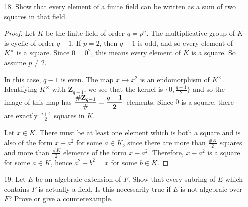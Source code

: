 \documentclass[10pt]{article}
\newcommand{\Z}{\mathbf{Z}}
\let\ker\relax
\DeclareMathOperator*{\ker}{Ker}
\DeclareMathOperator*{\Char}{char}
\begin{document}
\begin{enumerate}
\begin{proof}
Now, suppose $\Char(K) = p$ and every element of $K$ has a $p$-th root in $K$.  Assume, for a contradiction, that some element $\alpha$ is not separable over $K$, and let $f(X)$ be its minimal polynomial.  Then $f(X) = a_nX^n + \cdots + a_1X + a_0$.  Each $a_i$ has a $p$th root $b_i$, and so
$$
f(X) = a_nX^n + \cdots + a_1X + a_0 = (b_nX^n + \cdots + b_1X + b_0)^p
$$
contradicting that $f(X)$ was irreducible.

For the converse, suppose that every algebraic extension of $K$ is separable but that $\Char(K) \neq 0$, so that $\Char(K) = p$.  Let $a \in K$ and consider the polynomial $f(X) = X^p - a$.  If $\alpha$ is a root of this in some algebraic closure, then the minimal polynomial of $\alpha$ over $K$ divides $f(X) = (X - \alpha)^p$, hence is of the form $(X - \alpha)^q$ for some $q \leq p$.  If $q > 1$ then $\alpha$ is not separable, a contradiction.  So $X - \alpha \in K[X]$, meaning $\alpha \in K$.  So every element of $K$ has a $p$th root in $K$.
\end{proof}

\item[18.] Show that every element of a finite field can be written as a sum of two squares in that field.

\begin{proof}
Let $K$ be the finite field of order $q = p^n$.  The multiplicative group of $K$ is cyclic of order $q-1$.  If $p = 2$, then $q-1$ is odd, and so every element of $K^\times$ is a square.  Since $0 = 0^2$, this means every element of $K$ is a square.  So assume $p \neq 2$.

In this case, $q-1$ is even.  The map $x \mapsto x^2$ is an endomorphism of $K^\times$.  Identifying $K^\times$ with $\Z_{q-1}$, we see that the kernel is $\{0, \frac{q-1}{2}\}$ and so the image of this map has $\dfrac{\# \Z_{q-1}}{\# \ker} = \dfrac{q-1}{2}$ elements.  Since $0$ is a square, there are exactly $\frac{q+1}{2}$ squares in $K$.

Let $x \in K$.  There must be at least one element which is both a square and is also of the form $x - a^2$ for some $a \in K$, since there are more than $\frac{\# K}{2}$ squares and more than $\frac{\# K} {2}$ elements of the form $x - a^2$.  Therefore, $x - a^2$ is a square for some $a \in K$, hence $a^2 + b^2 = x$ for some $b \in K$.
\end{proof}

\item[19.] Let $E$ be an algebraic extension of $F$.  Show that every subring of $E$ which contains $F$ is actually a field.  Is this necessarily true if $E$ is not algebraic over $F$?  Prove or give a counterexample.


\end{enumerate}
\end{document}
